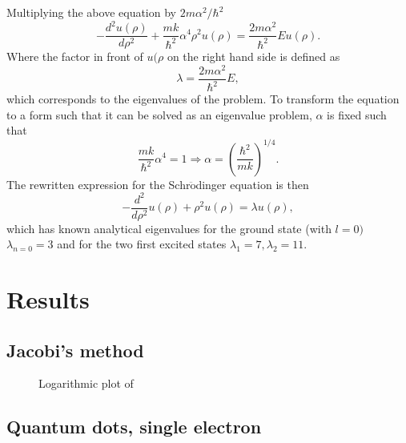 \documentclass{emulateapj}
\begin{document}
%
Multiplying the above equation by $2m\alpha^2 / \hbar^2$
%
\begin{equation*}
    -\frac{d^2u(\rho)}{d\rho^2} + \frac{mk}{\hbar^2}\alpha^4 \rho^2u(\rho) = \frac{2m\alpha^2}{\hbar^2}Eu(\rho).
\end{equation*}
%
Where the factor in front of $u(\rho$ on the right hand side is defined as
%
\begin{equation*}
    \lambda = \frac{2m\alpha^2}{\hbar^2}E,
\end{equation*}
%
which corresponds to the eigenvalues of the problem. To transform the equation to a form such that it can be solved as an eigenvalue problem, $\alpha$ is fixed such that
%
\begin{equation*}
    \frac{mk}{\hbar^2}\alpha^4 = 1
    \Rightarrow \alpha = \left(\frac{\hbar^2}{mk}\right)^{1/4}.
\end{equation*}
%
The rewritten expression for the Schr$\ddot{\mathrm{o}}$dinger equation is then
%
\begin{equation*}
    -\frac{d^2}{d\rho^2}u(\rho) + \rho^2u(\rho) = \lambda u(\rho),
\end{equation*}
%
which has known analytical eigenvalues for the ground state (with $l=0)$ $\lambda_{n=0} = 3$ and for the two first excited states $\lambda_1 = 7, \lambda_2 = 11$.


\section{Results}
\label{sec:results}

\subsection{Jacobi's method}

\begin{figure}[t]
\mbox{}
\caption{Logarithmic plot of }
\label{fig:fig1}
\end{figure}

\subsection{Quantum dots, single electron}

\begin{figure}[t]
\mbox{}
\caption{}
\label{fig:fig2}
\end{figure}
\end{document}
